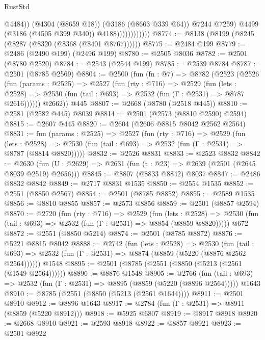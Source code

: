 \begin{lexlean}{RustStd}
\begin{coremodule}
{\begin{coremodule}
{{{{{{{{{{{{{{{{{{{{                                  @4484))
                              (@4304 (@8659 @18))
                              (@3186 (@8663 @339 @64))
                              @7244
                              @7259)
                            @4499
                            (@3186 (@4505 @399 @340))
                            @4188))))))))))))
@8774 := @8138 (@8199 (@8245 (@8287 (@8320 (@8368 (@8401 @8767))))))
@8775 := @2484 @199
@8779 := @2486 (@2490 @199) (@2496 @199)
@8780 := @2505 @8036
@8782 := @2501 (@8780 @2520)
@8784 := @2543 (@2544 @199)
@8785 := @2539 @8784
@8787 := @2501 (@8785 @2569)
@8804 := @2500
    (fun (fn : @7) =>
    @8782
      (@2523
        (@2526
          (fun (params : @2525) =>
          @2527
            (fun (rty : @716) =>
            @2529
              (fun (lets : @2528) =>
              @2530 (fun (tail : @693) => @2532 (fun (Γ : @2531) => @8787 @2616))))))
        @2662))
    @445
@8807 := @2668 (@8780 (@2518 @445))
@8810 := @2581 (@2582 @445) @8039
@8814 := @2501 (@2573 (@8810 @2590) @2594)
@8815 := @2607 @445
@8820 := @2604 (@2606 @8815 @8042 @2562 @2564)
@8831 := fun (params : @2525) =>
  @2527
    (fun (rty : @716) =>
    @2529
      (fun (lets : @2528) =>
      @2530 (fun (tail : @693) => @2532 (fun (Γ : @2531) => @8787 (@8814 @8820)))))
@8832 := @2526 @8831
@8833 := @2523 @8832
@8842 := @2630 (fun (U : @2629) => @2631 (fun (t : @23) => @2639 (@2501 (@2645 @8039 @2519) @2656)))
@8845 := @8807 (@8833 @8842) @8037
@8847 := @2486 @8832 @8842
@8849 := @2717 @8831 @1535
@8850 := @2554 @1535
@8852 := @2551 (@8850 @2567)
@8854 := @2501 (@8785 @8852)
@8855 := @2589 @1535
@8856 := @8810 @8855
@8857 := @2573 @8856
@8859 := @2501 (@8857 @2594)
@8870 := @2720
    (fun (rty : @716) =>
    @2529
      (fun (lets : @2528) =>
      @2530 (fun (tail : @693) => @2532 (fun (Γ : @2531) => @8854 (@8859 @8820)))))
    @672
@8872 := @2551 (@8850 @5214)
@8874 := @2501 (@8785 @8872)
@8876 := @5221 @8815 @8042
@8888 := @2742
    (fun (lets : @2528) =>
    @2530
      (fun (tail : @693) => @2532 (fun (Γ : @2531) => @8874 (@8859 (@5220 (@8876 @2562 @2564))))))
    @1548
@8895 := @2501 (@8785 (@2551 (@8850 (@5213 (@2561 (@1549 @2564))))))
@8896 := @8876 @1548
@8905 := @2766
    (fun (tail : @693) => @2532 (fun (Γ : @2531) => @8895 (@8859 (@5220 (@8896 @2564)))))
    @1643
@8910 := @8785 (@2551 (@8850 (@5213 (@2561 @1644))))
@8911 := @2501 @8910
@8912 := @8896 @1643
@8917 := @2784 (fun (Γ : @2531) => @8911 (@8859 (@5220 @8912)))
@8918 := @5925 @6807
@8919 := @8917 @8918
@8920 := @2668 @8910
@8921 := @2593 @8918
@8922 := @8857 @8921
@8923 := @2501 @8922
}}}}}}}}}}}}}}}}}}}}
\end{coremodule}}
\end{coremodule}
\end{lexlean}
